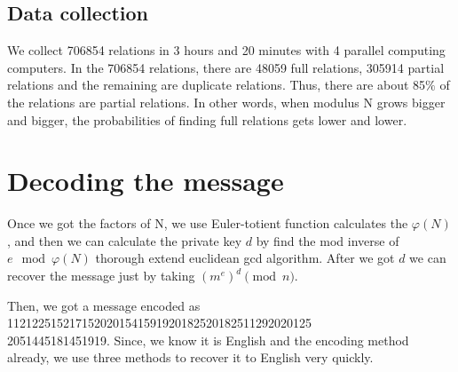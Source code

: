 \documentclass[12pt]{article} %
\begin{document}
	\subsection{Data collection}
	We collect 706854 relations in 3 hours and 20 minutes with 4 parallel computing computers. In the 706854 relations, there are 48059 full relations, 305914 partial relations and the remaining are duplicate relations.
	Thus, there are about 85$\%$ of the relations are partial relations. In other words, when modulus N grows bigger and bigger, the probabilities of finding full relations gets lower and lower.
	
	\section {Decoding the message}
	
	Once we got the factors of N, we use Euler-totient function calculates the $\varphi(N)$, and then we can calculate the private key $d$ by find the mod inverse of $e \mod{\varphi(N)}$ thorough extend euclidean gcd algorithm. After we got $d$ we can recover the message just by taking $(m^e)^d \pmod{n}$. 
	
	Then, we got a message encoded as 1121225152171520201541591920182520182511292020125\\2051445181451919. Since, we know it is English and the encoding method already, we use three methods to recover it to English very quickly. 
	
\end{document}
